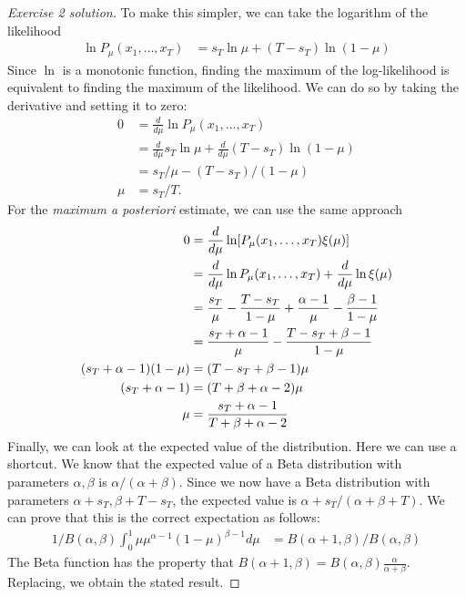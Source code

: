 \documentclass[twoside,a4paper]{article}
\begin{document}
  \begin{proof}[Exercise 2 solution]
    To make this simpler, we can take the logarithm of the likelihood
    \begin{align*}
      \ln P_\mu(x_1, \ldots, x_T)
      &=  s_T \ln \mu + (T - s_T) \ln (1 - \mu)
    \end{align*}
    Since $\ln$ is a monotonic function, finding the maximum of the log-likelihood is equivalent to finding the maximum of the likelihood. We can do so by taking the derivative and setting it to zero:
    \begin{align*}
      0 &= \frac{d}{d\mu} \ln P_\mu(x_1, \ldots, x_T)\\
        &=  \frac{d}{d\mu} s_T \ln \mu + \frac{d}{d\mu}  (T - s_T) \ln (1 - \mu)\\
        &=   s_T/\mu  - (T - s_T) / (1 - \mu)\\
      \mu &=   s_T /T.
    \end{align*}
    For the \emph{maximum a posteriori} estimate, we can use the same approach
    \begin{align*}
      0 &=\frac{d}{d\mu} \ln [P_\mu(x_1, \ldots, x_T) \xi(\mu)]\\
      &=
        \frac{d}{d\mu} \ln P_\mu(x_1, \ldots, x_T) + \frac{d}{d\mu} \ln \xi(\mu)\\
      &=
        \frac{s_T}{\mu} - \frac{T - s_T}{1 - \mu}
        +
        \frac{\alpha - 1}{\mu} -  \frac{\beta - 1}{1 - \mu}\\
      &=
        \frac{s_T + \alpha - 1}{\mu}  - \frac{T - s_T + \beta - 1}{1 - \mu}\\
      (s_T + \alpha - 1)(1 - \mu) &= (T - s_T + \beta - 1) \mu\\
      (s_T + \alpha - 1)  &= (T + \beta + \alpha - 2 ) \mu\\
      \mu & = \frac{s_T + \alpha - 1}{T + \beta + \alpha - 2 }
    \end{align*}
    Finally, we can look at the expected value of the distribution. Here we can use a shortcut. We know that the expected value of a Beta distribution with parameters $\alpha, \beta$ is $\alpha / (\alpha + \beta)$. Since we now have a Beta distribution with parameters $\alpha + s_T, \beta + T - s_T$, the expected value is $\alpha + s_T / (\alpha + \beta + T)$. We can prove that this is the
    correct expectation as follows:
    \begin{align*}
      1/B(\alpha, \beta)
      \int_0^1 
      \mu \mu^{\alpha- 1}
      (1 - \mu)^{\beta - 1} d\mu
      &=
        B(\alpha + 1, \beta)/B(\alpha, \beta)
    \end{align*}
    The Beta function has the property that $B(\alpha + 1, \beta) = B(\alpha, \beta) \frac{\alpha}{\alpha + \beta}$. Replacing, we obtain the stated result.
  \end{proof}
\fi
\end{document}
